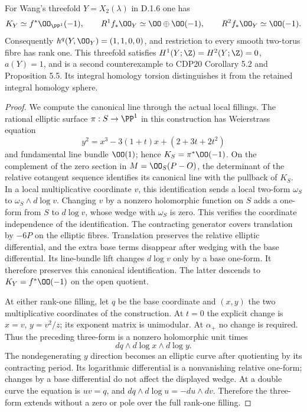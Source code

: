 \begin{proposition}
\label{st:D.1.13}
For Wang's threefold $Y=X_2(\lambda)$ in D.1.6 one has
\[
K_Y\simeq f^*\OO_{\PP^1}(-1),\qquad
R^1f_*\OO_Y\simeq\OO\oplus\OO(-1),\qquad
R^2f_*\OO_Y\simeq\OO(-1).
\]
Consequently $h^q(Y,\OO_Y)=(1,1,0,0)$, and restriction to every
smooth two-torus fibre has rank one. This threefold satisfies
$H^1(Y;\Z)=H^2(Y;\Z)=0$, $a(Y)=1$, and is a second
counterexample to CDP20 Corollary 5.2 and Proposition 5.5.
Its integral homology torsion distinguishes it from the retained
integral homology sphere.
\end{proposition}
\begin{proof}
We compute the canonical line through the actual local fillings.
The rational elliptic surface $\pi:S\to\PP^1$ in this construction
has Weierstrass equation
\[
y^2=x^3-3(1+t)x+(2+3t+2t^2)
\]
and fundamental line bundle $\OO(1)$; hence
$K_S=\pi^*\OO(-1)$. On the complement of the zero section in
$M=\OO_S(P-O)$, the determinant of the relative cotangent sequence
identifies its canonical line with the pullback of $K_S$.
In a local multiplicative coordinate $v$, this identification sends
a local two-form $\omega_S$ to $\omega_S\wedge d\log v$.
Changing $v$ by a nonzero holomorphic function on $S$ adds a
one-form from $S$ to $d\log v$, whose wedge with $\omega_S$ is zero.
This verifies the coordinate independence of the identification.
The contracting generator covers translation by $-6P$ on the
elliptic fibres. Translation preserves the relative elliptic
differential, and the extra base terms disappear after wedging
with the base differential. Its line-bundle lift changes $d\log v$
only by a base one-form. It therefore preserves this canonical
identification. The latter descends to
$K_Y=f^*\OO(-1)$ on the open quotient.

At either rank-one filling, let $q$ be the base coordinate and
$(x,y)$ the two multiplicative coordinates of the construction.
At $t=0$ the explicit change is $x=v$, $y=v^2/z$; its exponent
matrix is unimodular. At $\alpha_+$ no change is required.
Thus the preceding three-form is a nonzero holomorphic unit times
\[
dq\wedge d\log x\wedge d\log y.
\]
The nondegenerating $y$ direction becomes an elliptic curve after
quotienting by its contracting period. Its logarithmic differential
is a nonvanishing relative one-form; changes by a base differential
do not affect the displayed wedge. At a double curve the equation
is $uv=q$, and
$dq\wedge d\log u=-du\wedge dv$. Therefore the three-form extends
without a zero or pole over the full rank-one filling.


\end{proof}

